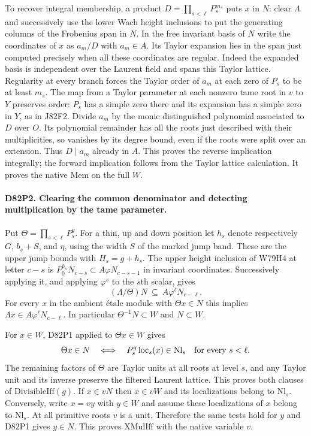 To recover integral membership, a product
$D=\prod_{s<\ell}P_s^{m_s}$ puts $x$ in $N$:
clear $\Lambda$ and successively use the lower Wach height
inclusions to put the generating columns of the Frobenius span
in $N$. In the free invariant basis of $N$ write the coordinates
of $x$ as $a_m/D$ with $a_m\in A$. Its Taylor expansion lies
in the span just computed precisely when all these coordinates
are regular. Indeed the expanded basis is independent over
the Laurent field and spans this Taylor lattice. Regularity at
every branch forces the Taylor order of $a_m$ at each zero
of $P_s$ to be at least $m_s$. The map from a Taylor parameter
at each nonzero tame root in $v$ to $Y$ preserves order:
$P_s$ has a simple zero there and its expansion has a simple
zero in $Y$, as in J82F2. Divide $a_m$ by the monic
distinguished polynomial associated to $D$ over $O$. Its
polynomial remainder has all the roots just described with
their multiplicities, so vanishes by its degree bound, even
if the roots were split over an extension. Thus $D\mid a_m$
already in $A$. This proves the reverse implication integrally;
the forward implication follows from the Taylor lattice calculation.
It proves the native $\mathrm{Mem}$ on the full $W$.

\paragraph{D82P2. Clearing the common denominator and detecting multiplication by the tame parameter.}
Put $\Theta=\prod_{s<\ell}P_s^g$. For a thin, up and down
position let $h_s$ denote respectively $G$, $b_s+S$, and
$\eta$, using the width $S$ of the marked jump band. These are
the upper jump bounds with $H_s=g+h_s$. The upper height
inclusion of W79H4 at letter $c-s$ is
$P_0^{h_s}N_{c-s}\subset A\varphi N_{c-s-1}$ in invariant
coordinates. Successively applying it, and applying
$\varphi^s$ to the $s$th scalar, gives
\[
          (\Lambda/\Theta)N
              \ \subseteq\ A\varphi^\ell N_{c-\ell}.
\]
For every $x$ in the ambient \'etale module with $\Theta x\in N$
this implies $\Lambda x\in A\varphi^\ell N_{c-\ell}$.
In particular $\Theta^{-1}N\subset W$ and $N\subset W$.

For $x\in W$, D82P1 applied to $\Theta x\in W$ gives
\[
 \Theta x\in N\quad\Longleftrightarrow\quad
 P_s^g\,\mathrm{loc}_s(x)\in\mathrm{Nl}_s
                              \quad\hbox{for every }s<\ell .
\]
The remaining factors of $\Theta$ are Taylor units at all roots
at level $s$, and any Taylor unit and its inverse preserve the
filtered Laurent lattice. This proves both clauses of
$\mathrm{DivisibleIff}(g)$.
If $x\in vN$ then $x\in vW$ and its localizations belong
to $\mathrm{Nl}_s$. Conversely, write $x=vy$ with $y\in W$
and assume these localizations of $x$ belong to $\mathrm{Nl}_s$.
At all primitive roots $v$ is a unit. Therefore the same tests
hold for $y$ and D82P1 gives $y\in N$. This proves
$\mathrm{XMulIff}$ with the native variable $v$.

